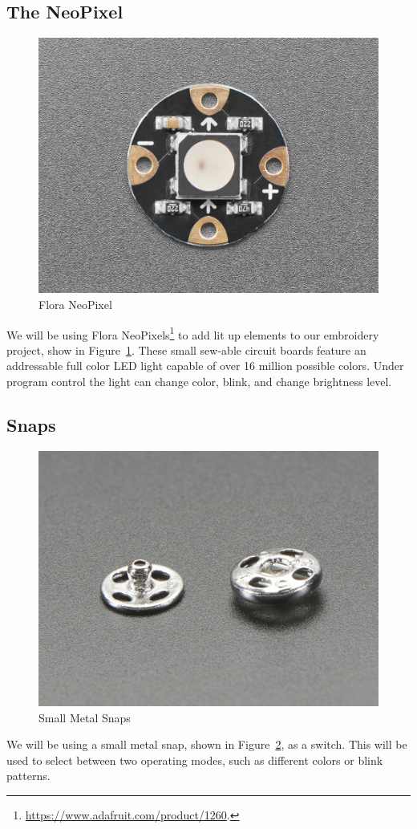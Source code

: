 \documentclass[letterpaper,twoside,12pt]{article}
\begin{document}
\subsection{The NeoPixel}
\begin{figure}[hbpt]\begin{centering}%
\includegraphics[width=5in]{FloraNeoPixel.jpg}
\caption{Flora NeoPixel}
\label{fig:floraneopixel}
\end{centering}\end{figure}
We will be using Flora
NeoPixels\footnote{\url{https://www.adafruit.com/product/1260}.} to add lit up
elements to our embroidery project, show in Figure~\ref{fig:floraneopixel}.
These small sew-able circuit boards feature an addressable full color LED light
capable of over 16 million possible colors.  Under program control the light 
can change color, blink, and change brightness level.
\clearpage
\subsection{Snaps}
\begin{figure}[hbpt]\begin{centering}%
\includegraphics[width=5in]{snap.jpg}
\caption{Small Metal Snaps}
\label{fig:snaps}
\end{centering}\end{figure}
We will be using a small metal snap, shown in Figure~\ref{fig:snaps}, as a 
switch.  This will be used to select between two operating modes, such as
different colors or blink patterns.
\clearpage
\end{document}
